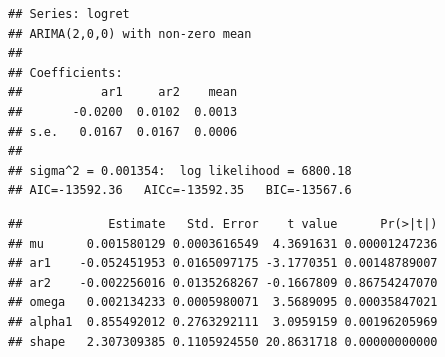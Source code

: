 \documentclass[
]{book}
\newenvironment{Shaded}{\begin{snugshade}}{\end{snugshade}}
\newcommand{\AttributeTok}[1]{\textcolor[rgb]{0.13,0.29,0.53}{#1}}
\newcommand{\CommentTok}[1]{\textcolor[rgb]{0.56,0.35,0.01}{\textit{#1}}}
\newcommand{\DecValTok}[1]{\textcolor[rgb]{0.00,0.00,0.81}{#1}}
\newcommand{\FunctionTok}[1]{\textcolor[rgb]{0.13,0.29,0.53}{\textbf{#1}}}
\newcommand{\NormalTok}[1]{#1}
\newcommand{\OtherTok}[1]{\textcolor[rgb]{0.56,0.35,0.01}{#1}}
\newcommand{\SpecialCharTok}[1]{\textcolor[rgb]{0.81,0.36,0.00}{\textbf{#1}}}
\newcommand{\StringTok}[1]{\textcolor[rgb]{0.31,0.60,0.02}{#1}}
\begin{document}
\begin{verbatim}
## Series: logret 
## ARIMA(2,0,0) with non-zero mean 
## 
## Coefficients:
##           ar1     ar2    mean
##       -0.0200  0.0102  0.0013
## s.e.   0.0167  0.0167  0.0006
## 
## sigma^2 = 0.001354:  log likelihood = 6800.18
## AIC=-13592.36   AICc=-13592.35   BIC=-13567.6
\end{verbatim}

\begin{Shaded}
\end{Shaded}

\begin{verbatim}
##            Estimate   Std. Error    t value      Pr(>|t|)
## mu      0.001580129 0.0003616549  4.3691631 0.00001247236
## ar1    -0.052451953 0.0165097175 -3.1770351 0.00148789007
## ar2    -0.002256016 0.0135268267 -0.1667809 0.86754247070
## omega   0.002134233 0.0005980071  3.5689095 0.00035847021
## alpha1  0.855492012 0.2763292111  3.0959159 0.00196205969
## shape   2.307309385 0.1105924550 20.8631718 0.00000000000
\end{verbatim}
\end{document}
